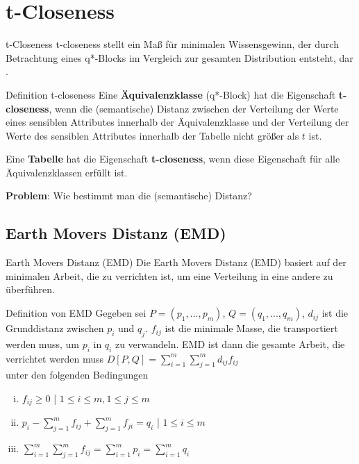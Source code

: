 \section{t-Closeness}

\begin{frame}{t-Closeness}
	t-closeness stellt ein Maß für minimalen Wissensgewinn, der durch Betrachtung eines q*-Blocks im Vergleich zur gesamten Distribution entsteht, dar \cite{kltHauf}.

	\begin{block}{Definition t-closeness}
		Eine \textbf{Äquivalenzklasse} (q*-Block) hat die Eigenschaft \textbf{t-closeness}, wenn die (semantische) Distanz zwischen der Verteilung der Werte eines sensiblen Attributes innerhalb der Äquivalenzklasse und der Verteilung der Werte des sensiblen Attributes innerhalb der Tabelle nicht größer als \(t\) ist. 

		Eine \textbf{Tabelle} hat die Eigenschaft \textbf{t-closeness}, wenn diese Eigenschaft für alle Äquivalenzklassen erfüllt ist.	
	\end{block}

	\textbf{Problem}: Wie bestimmt man die (semantische) Distanz?
\end{frame}

\subsection{Earth Movers Distanz (EMD)}

\begin{frame}{Earth Movers Distanz (EMD)}
	Die Earth Movers Distanz (EMD) basiert auf der minimalen Arbeit, die zu verrichten ist, um eine Verteilung in eine andere zu überführen.
	\begin{block}{Definition von EMD \cite{Li2007t-closseness}}
		Gegeben sei $P=(p_1,...,p_m)$, $Q=(q_1,...,q_m)$, $d_{ij}$ ist die Grunddistanz zwischen $p_i$ und $q_j$. $f_{ij}$ ist die minimale Masse, die transportiert werden muss, um $p_i$ in $q_i$ zu verwandeln. EMD ist dann die gesamte Arbeit, die verrichtet werden muss $D[P,Q] = \sum_{i=1}^m \sum_{j=1}^m d_{ij} f_{ij}$\\
		unter den folgenden Bedingungen
		\begin{enumerate}[i)]
			\item $f_{ij}\ge 0$ | $1\le i \le m, 1\le j \le m$		
			\item $p_i - \sum_{j=1}^{m}f_{ij} +\sum_{j=1}^{m}f_{ji} = q_i$ | $1 \le i \le m$
			\item $\sum_{i=1}^{m}\sum_{j=1}^{m} f_{ij} = \sum_{i=1}^{m} p_i = \sum_{i=1}^{m} q_i$ 
		\end{enumerate}
	\end{block}
\end{frame}

